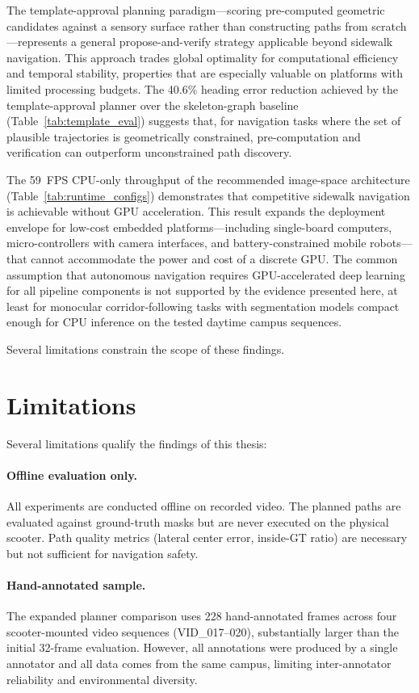 \documentclass[12pt,letterpaper,oneside]{report}
\begin{document}
The template-approval planning paradigm---scoring pre-computed geometric candidates against a sensory surface rather than constructing paths from scratch---represents a general propose-and-verify strategy applicable beyond sidewalk navigation.  This approach trades global optimality for computational efficiency and temporal stability, properties that are especially valuable on platforms with limited processing budgets.  The 40.6\% heading error reduction achieved by the template-approval planner over the skeleton-graph baseline (Table~\ref{tab:template_eval}) suggests that, for navigation tasks where the set of plausible trajectories is geometrically constrained, pre-computation and verification can outperform unconstrained path discovery.

The 59~FPS CPU-only throughput of the recommended image-space architecture (Table~\ref{tab:runtime_configs}) demonstrates that competitive sidewalk navigation is achievable without GPU acceleration.  This result expands the deployment envelope for low-cost embedded platforms---including single-board computers, micro-controllers with camera interfaces, and battery-constrained mobile robots---that cannot accommodate the power and cost of a discrete GPU.  The common assumption that autonomous navigation requires GPU-accelerated deep learning for all pipeline components is not supported by the evidence presented here, at least for monocular corridor-following tasks with segmentation models compact enough for CPU inference on the tested daytime campus sequences.

Several limitations constrain the scope of these findings.


\section{Limitations}

Several limitations qualify the findings of this thesis:

\paragraph{Offline evaluation only.} All experiments are conducted offline on recorded video.  The planned paths are evaluated against ground-truth masks but are never executed on the physical scooter.  Path quality metrics (lateral center error, inside-GT ratio) are necessary but not sufficient for navigation safety.

\paragraph{Hand-annotated sample.} The expanded planner comparison uses 228 hand-annotated frames across four scooter-mounted video sequences (VID\_017--020), substantially larger than the initial 32-frame evaluation.  However, all annotations were produced by a single annotator and all data comes from the same campus, limiting inter-annotator reliability and environmental diversity.
\end{document}
